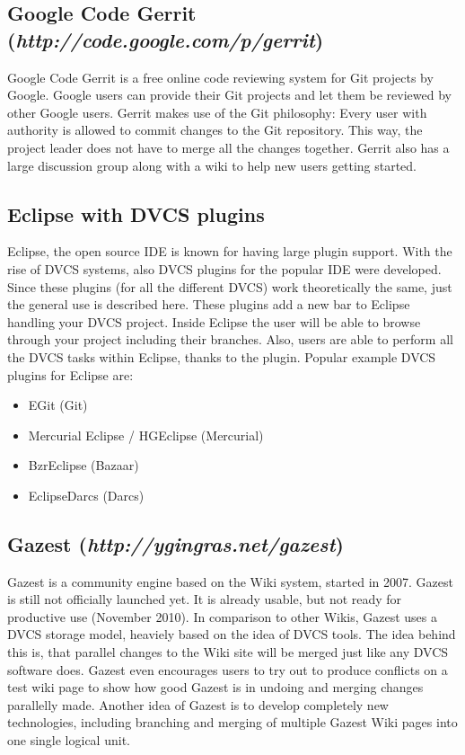 \subsection{Google Code Gerrit (\textit{http://code.google.com/p/gerrit})}

Google Code Gerrit is a free online code reviewing system for Git projects by Google. Google users can provide their Git projects and let them be reviewed by other Google users. Gerrit makes use of the Git philosophy: Every user with authority is allowed to commit changes to the Git repository. This way, the project leader does not have to merge all the changes together. Gerrit also has a large discussion group along with a wiki to help new users getting started. 

\subsection{Eclipse with DVCS plugins}

Eclipse, the open source IDE is known for having large plugin support. With the rise of DVCS systems, also DVCS plugins for the popular IDE were developed. Since these plugins (for all the different DVCS) work theoretically the same, just the general use is described here. These plugins add a new bar to Eclipse handling your DVCS project. Inside Eclipse the user will be able to browse through your project including their branches. Also, users are able to perform all the DVCS tasks within Eclipse, thanks to the plugin.
\newline
Popular example DVCS plugins for Eclipse are:

\begin{itemize}
	\item EGit (Git)
	\item Mercurial Eclipse / HGEclipse (Mercurial)
	\item BzrEclipse (Bazaar)
	\item EclipseDarcs (Darcs)
\end{itemize}

\cite{eclipseplugins}

\subsection{Gazest (\textit{http://ygingras.net/gazest})}

Gazest is a community engine based on the Wiki system, started in 2007. Gazest is still not officially launched yet. It is already usable, but not ready for productive use (November 2010). In comparison to other Wikis, Gazest uses a DVCS storage model, heaviely based on the idea of DVCS tools. The idea behind this is, that parallel changes to the Wiki site will be merged just like any DVCS software does. Gazest even encourages users to try out to produce conflicts on a test wiki page to show how good Gazest is in undoing and merging changes parallelly made. Another idea of Gazest is to develop completely new technologies, including branching and merging of multiple Gazest Wiki pages into one single logical unit.
